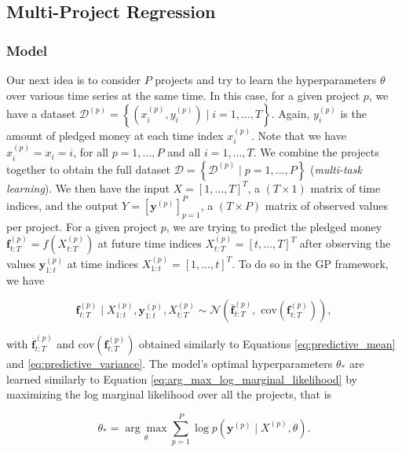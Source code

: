 \documentclass[11pt, oneside]{article}   	%
\begin{document}
         \subsection{Multi-Project Regression}
         	\subsubsection*{Model}
        			Our next idea is to consider $P$ projects and try to learn the hyperparameters $\theta$ over various time series at the same time. In this case, for a given project $p$, we have a dataset $\mathcal{D}^{(p)} = \left\{ (x_i^{(p)}, y_i^{(p)}) \mid i = 1, ..., T \right\}$. Again, $y_i^{(p)}$ is the amount of pledged money at each time index $x_i^{(p)}$. Note that we have $x_i^{(p)}= x_i = i$, for all $p=1,...,P$ and all $i=1,...,T$. We combine the projects together to obtain the full dataset $\mathcal{D} = \left\{ \mathcal{D}^{(p)} \mid p = 1, ..., P \right\}$ (\textit{multi-task learning}). We then have the input $X = [1, ..., T]^T$, a $(T \times 1)$ matrix of time indices, and the output $Y = \left[\mathbf{y}^{(p)} \right]_{p=1}^P$, a $(T \times P)$ matrix of observed values per project. For a given project $p$, we are trying to predict the pledged money $\mathbf{f}_{t:T}^{(p)} = f(X_{t:T}^{(p)})$ at future time indices $X_{t:T}^{(p)} = [t,...,T]^T$ after observing the values $\mathbf{y}_{1:t}^{(p)}$ at time indices $X_{1:t}^{(p)} = [1, ..., t]^T$. To do so in the GP framework, we have
        
                        \begin{equation}
                        		\mathbf{f}_{t:T}^{(p)} \mid X_{1:t}^{(p)}, \mathbf{y}_{1:t}^{(p)}, X_{t:T}^{(p)} \sim \mathcal{N} \left( \overline{\mathbf{f}}_{t:T}^{(p)}, \text{ cov}(\mathbf{f}_{t:T}^{(p)}) \right),
                		\end{equation}
                		        
                        with $\overline{\mathbf{f}}_{t:T}^{(p)}  $ and $\text{cov}(\mathbf{f}_{t:T}^{(p)}) $ obtained similarly to Equations \ref{eq:predictive_mean} and \ref{eq:predictive_variance}. The model's optimal hyperparameters $\theta_*$ are learned similarly to Equation \ref{eq:arg_max_log_marginal_likelihood} by maximizing the log marginal likelihood over all the projects, that is
                        
                        \begin{equation}
                        		\theta_* = \underset{\theta} {\arg\max} \sum_{p=1}^P \log p(\mathbf{y}^{(p)} \mid X^{(p)}, \theta).
                        \end{equation}
                        
\end{document}
